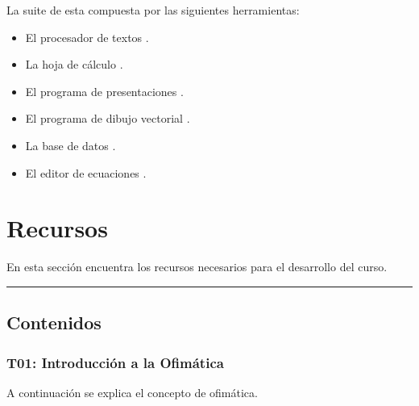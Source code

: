 \documentclass[letterpaper,10pt,spanish]{sphinxmanual}
\begin{document}
\sphinxAtStartPar
La suite de  esta compuesta por las siguientes herramientas:
\begin{itemize}
\item {} 
\sphinxAtStartPar
El procesador de textos .

\item {} 
\sphinxAtStartPar
La hoja de cálculo .

\item {} 
\sphinxAtStartPar
El programa de presentaciones .

\item {} 
\sphinxAtStartPar
El programa de dibujo vectorial .

\item {} 
\sphinxAtStartPar
La base de datos .

\item {} 
\sphinxAtStartPar
El editor de ecuaciones .

\end{itemize}

\sphinxstepscope


\section{Recursos}
\label{\detokenize{cursos/ofimatica10/recursos/index:recursos}}\label{\detokenize{cursos/ofimatica10/recursos/index::doc}}
\sphinxAtStartPar
En esta sección encuentra los recursos necesarios para el desarrollo del curso.


\bigskip\hrule\bigskip



\subsection{Contenidos}
\label{\detokenize{cursos/ofimatica10/recursos/index:contenidos}}
\sphinxstepscope


\subsubsection{T01: Introducción a la Ofimática}
\label{\detokenize{cursos/ofimatica10/recursos/T01:t01-introduccion-a-la-ofimatica}}\label{\detokenize{cursos/ofimatica10/recursos/T01::doc}}
\sphinxAtStartPar
A continuación se explica el concepto de ofimática.
\end{document}
